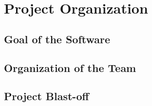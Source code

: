 \section{Project Organization}
\label{sec:project_organization}

\subsection{Goal of the Software}


\subsection{Organization of the Team}


\subsection{Project Blast-off}

